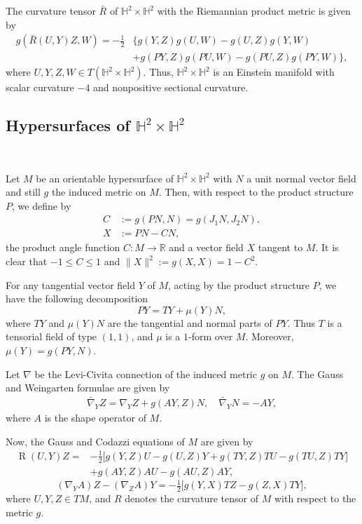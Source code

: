 \documentclass[reqno]{amsart}%
\theoremstyle{definition}
\numberwithin{equation}{section}
\begin{document}
The curvature tensor $\bar{R}$ of $\mathbb{H}^2\times\mathbb{H}^2$
with the Riemannian product metric is given by
\begin{align*}
g(\bar{R}(U,Y)Z,W)=-\tfrac{1}{2}&\big\{g(Y,Z)g(U,W)
-g(U,Z)g(Y,W)\\
&+g(PY,Z)g(PU,W)-g(PU,Z)g(PY,W)\big\},
\end{align*}
where $U, Y, Z, W\in T(\mathbb{H}^2\times\mathbb{H}^2)$. Thus, $\mathbb{H}^2\times\mathbb{H}^2$
is an Einstein manifold with scalar curvature $-4$ and nonpositive sectional curvature.

\subsection{Hypersurfaces of $\mathbb{H}^{2}\times \mathbb{H}^{2}$}~

Let $M$ be an orientable hypersurface of $\mathbb{H}^2\times\mathbb{H}^2$ with
$N$ a unit normal vector field and still $g$ the induced metric on $M$.
Then, with respect to the product structure $P$, we define by
%
\begin{align*}
C&:=g(PN,N)=g(J_1 N,J_2 N),\\
X&:=PN-CN,
\end{align*}
%
the product angle function $C: M\rightarrow\mathbb{R}$ and a vector field
$X$ tangent to $M$. It is clear that $-1\leq C\leq 1$ and $\|X\|^2:=g(X,X)=1-C^2$.

For any tangential vector field $Y$ of $M$, acting by the product structure $P$,
we have the following decomposition
$$
PY=T Y+\mu(Y)N,
$$
where $T Y$ and $\mu(Y)N$ are the tangential
and normal parts of $PY$. Thus $T$ is a
tensorial field of type $(1,1)$, and $\mu$ is a $1$-form over $M$.
Moreover, $\mu(Y)=g(PY, N)$.

Let $\nabla$ be the Levi-Civita connection of the induced metric $g$ on $M$.
The Gauss and Weingarten formulae are given by 
%
\begin{align*}
\bar{\nabla}_Y Z=\nabla_Y Z+g(AY,Z)N, \quad \bar{\nabla}_YN=-AY,
\end{align*}
%
where $A$ is the shape operator of $M$.

Now, the Gauss and Codazzi equations of $M$ are given by
%
\begin{equation}\label{eqn:2.2}
\begin{aligned}
\operatorname{R}(U, Y)Z=&-\tfrac{1}{2}\big[g(Y,Z)U-g(U,Z)Y+g(TY,Z)TU
-g(TU,Z)TY\big]\\
&+g(AY,Z)AU-g(AU,Z)AY,
\end{aligned}
\end{equation}
%
\begin{equation}\label{eqn:2.3}
(\nabla_YA)Z-(\nabla_Z A)Y=-\tfrac{1}{2}\big[g(Y,X)TZ-g(Z,X)TY\big],
\end{equation}
%
where $U, Y, Z\in TM$, and $R$ denotes the curvature tensor of $M$ with respect
to the metric $g$.
\end{document}
